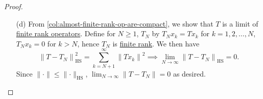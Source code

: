 \begin{proof}
\begin{enumerate}
		\item[(d)] From \autoref{col:almost-finite-rank-op-are-compact}, we show that \(T\) is a limit of \hyperref[rmk:finite-rank-op]{finite rank operators}. Define for \(N \geq 1\), \(T_N\) by \(T_N x_k = Tx_k\) for \(k = 1, 2, \ldots  , N\), \(T_{N}x_k = 0 \) for \(k > N\), hence \(T_N\) is \hyperref[rmk:finite-rank-op]{finite rank}. We then have
			\[
				\left\lVert T - T_{N} \right\rVert ^{2} _{\mathrm{HS} }= \sum_{k=N+1}^{\infty} \left\lVert T x_{k} \right\rVert ^{2}
				\implies \lim_{N \to \infty} \left\lVert T - T_{N} \right\rVert _{\mathrm{HS} }= 0.
			\]
			Since \(\lVert \cdot \rVert \leq \lVert \cdot \rVert _{\mathrm{HS} }\), \(\lim_{N \to \infty} \left\lVert T - T_N\right\rVert = 0\) as desired.
	\end{enumerate}
\end{proof}

